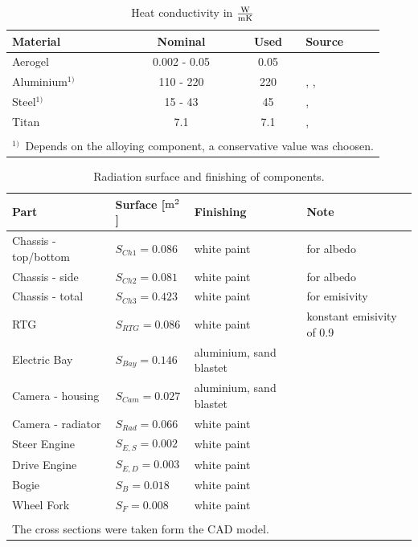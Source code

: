 \begin{table}[H]
	\centering
	\caption{Heat conductivity in $\frac{{\rm W}}{{\rm m} {\rm K}}$}
	\begin{tabular}{l@{\qquad\qquad}c@{\qquad\qquad}c@{\qquad\qquad}l}
		\hline
		Material & Nominal & Used & Source \\ \hline
		Aerogel & 0.002 - 0.05 & 0.05 & \cite{ref_tcs_03} \\
		Aluminium$^{1)}$  & 110 - 220 & 220 & \cite{ref_tcs_10}, \cite{ref_tcs_11}, \cite{ref_tcs_12} \\
		Steel$^{1)}$ & 15 - 43 & 45 & \cite{ref_tcs_08}, \cite{ref_tcs_09} \\ 
		Titan  & 7.1  & 7.1 & \cite{ref_tcs_06}, \cite{ref_tcs_07} \\\hline
		&&&\\[-0.75em]
		\multicolumn{4}{l}{\small{$^{1)}$\  Depends on the alloying component, a conservative value was choosen.}}\\
	\end{tabular}
	\label{tab:tcs_conduct2}
\end{table}

\begin{table}[H]
	\centering
	\caption{Radiation surface and finishing of components.}
	\begin{tabular}{l@{\qquad}l@{\qquad}ll}
		\hline
		Part  & Surface [${\rm m}^2$] & Finishing & Note \\ \hline
		Chassis - top/bottom & $S_{Ch1}=0.086$ &  white paint & for albedo\\
		Chassis - side & $S_{Ch2}=0.081$ &  white paint & for albedo\\
		Chassis - total & $S_{Ch3}=0.423$ &  white paint & for emisivity\\
		RTG& $S_{RTG}=0.086$ & white paint & konstant emisivity of 0.9\\
		Electric Bay& $S_{Bay}=0.146$ & aluminium, sand blastet & \\
		Camera - housing & $S_{Cam}=0.027$ &aluminium, sand blastet &\\
		Camera - radiator & $S_{Rad}=0.066$ & white paint &  \\
		Steer Engine& $S_{E,S}=0.002$ & white paint& \\
		Drive Engine& $S_{E,D}=0.003$ &white paint & \\
		Bogie & $S_{B}=0.018$ &white paint & \\
		Wheel Fork& $S_{F}=0.008$ &white paint & \\ \hline
		&&& \\
		\multicolumn{3}{l}{The cross sections were taken form the CAD model.}
	\end{tabular}
	\label{tab:tcs_surf}
\end{table}

